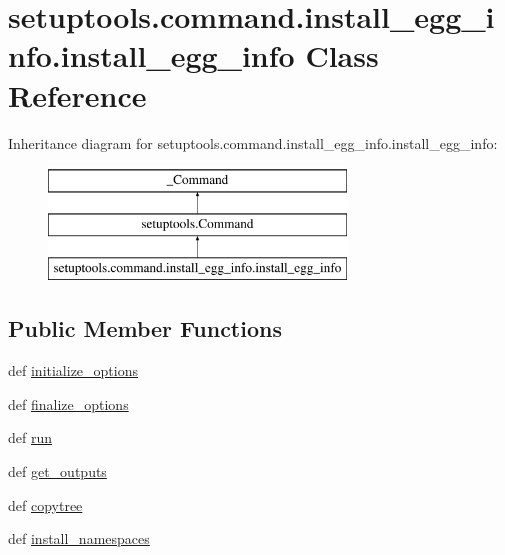 \hypertarget{classsetuptools_1_1command_1_1install__egg__info_1_1install__egg__info}{}\section{setuptools.\+command.\+install\+\_\+egg\+\_\+info.\+install\+\_\+egg\+\_\+info Class Reference}
\label{classsetuptools_1_1command_1_1install__egg__info_1_1install__egg__info}
Inheritance diagram for setuptools.\+command.\+install\+\_\+egg\+\_\+info.\+install\+\_\+egg\+\_\+info\+:\begin{figure}[H]
\begin{center}
\leavevmode
\includegraphics[height=3.000000cm]{classsetuptools_1_1command_1_1install__egg__info_1_1install__egg__info}
\end{center}
\end{figure}
\subsection*{Public Member Functions}
\begin{DoxyCompactItemize}
\item 
def \hyperlink{classsetuptools_1_1command_1_1install__egg__info_1_1install__egg__info_a99d04582ac39b8d6b71f6779258b9af1}{initialize\+\_\+options}
\item 
def \hyperlink{classsetuptools_1_1command_1_1install__egg__info_1_1install__egg__info_aecb90501f11dda376fb94c26d0bc6192}{finalize\+\_\+options}
\item 
def \hyperlink{classsetuptools_1_1command_1_1install__egg__info_1_1install__egg__info_acc88ea7e5da22ac22f2f766570e42b67}{run}
\item 
def \hyperlink{classsetuptools_1_1command_1_1install__egg__info_1_1install__egg__info_a8751599b5da7f6c419335902e9946fbc}{get\+\_\+outputs}
\item 
def \hyperlink{classsetuptools_1_1command_1_1install__egg__info_1_1install__egg__info_a1b856263ea70cd1f9102b470336944fd}{copytree}
\item 
def \hyperlink{classsetuptools_1_1command_1_1install__egg__info_1_1install__egg__info_a070b4154d63cea6a15f842eeb171cfa4}{install\+\_\+namespaces}
\end{DoxyCompactItemize}
